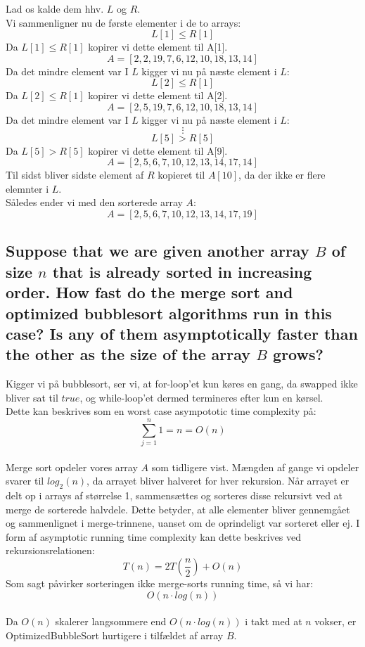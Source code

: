 \documentclass[a4paper,12pt]{article}
\begin{document}
Lad os kalde dem hhv. $L$ og $R$.\\
Vi sammenligner nu de første elementer i de to arrays:\\
\[L[1] \leq R[1]\]
Da $L[1] \leq R[1]$ kopirer vi dette element til A[1].\\
\[A = [2, 2, 19, 7, 6, 12, 10, 18, 13, 14]\]
Da det mindre element var I $L$ kigger vi nu på næste element i $L$:
\[L[2] \leq R[1]\]
Da $L[2] \leq R[1]$ kopirer vi dette element til A[2].\\
\[A = [2, 5, 19, 7, 6, 12, 10, 18, 13, 14]\]
Da det mindre element var I $L$ kigger vi nu på næste element i $L$:
\[\vdots\]
\[L[5] > R[5]\]
Da $L[5] > R[5]$ kopirer vi dette element til A[9].\\
\[A = [2, 5, 6, 7, 10, 12, 13, 14, 17, 14]\]
Til sidst bliver sidste element af $R$ kopieret til $A[10]$, da der ikke er flere elemnter i $L$.\\
Således ender vi med den sorterede array $A$:\\
\[A = [2, 5, 6, 7, 10, 12, 13, 14, 17, 19]\]

\subsection[]{Suppose that we are given another array $B$ of size $n$ that is already sorted in increasing order. How fast do the merge sort and optimized bubblesort algorithms run in this case? Is any of them asymptotically faster than the other as the size of the array $B$ grows?}

Kigger vi på bubblesort, ser vi, at for-loop'et kun køres en gang, da swapped ikke bliver sat til $true$, og while-loop'et dermed termineres efter kun en kørsel.\\
Dette kan beskrives som en worst case asympototic time complexity på:
\[\sum_{j=1}^{n}1=n=O(n)\]
\\
Merge sort opdeler vores array $A$ som tidligere vist. Mængden af gange vi opdeler svarer til $log_2(n)$, da arrayet bliver halveret for hver rekursion. Når arrayet er delt op i arrays af størrelse 1, sammensættes og sorteres disse rekursivt ved at merge de sorterede halvdele. Dette betyder, at alle elementer bliver gennemgået og sammenlignet i merge-trinnene, uanset om de oprindeligt var sorteret eller ej. I form af asymptotic running time complexity kan dette beskrives ved rekursionsrelationen:
\[T(n) = 2T(\dfrac{n}{2}) + O(n)\]
Som sagt påvirker sorteringen ikke merge-sorts running time, så vi har:
\[O(n \cdot log(n))\]
\\
Da $O(n)$ skalerer langsommere end $O(n \cdot log(n))$ i takt med at $n$ vokser, er OptimizedBubbleSort hurtigere i tilfældet af array $B$.
\end{document}
